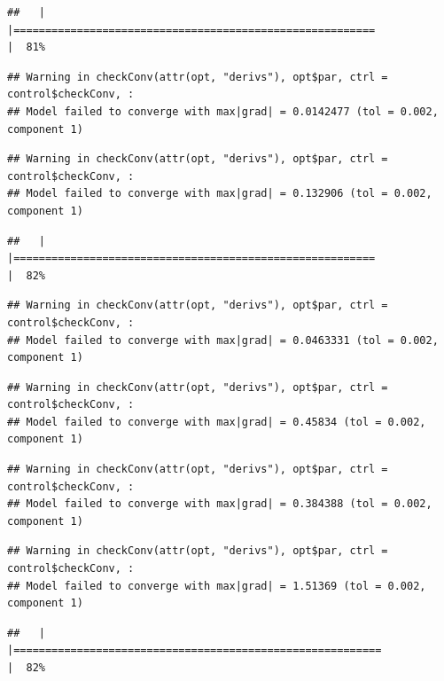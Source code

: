 \documentclass[
  12pt,
]{book}
\begin{document}
\begin{verbatim}
##   |                                                                              |=========================================================             |  81%
\end{verbatim}

\begin{verbatim}
## Warning in checkConv(attr(opt, "derivs"), opt$par, ctrl = control$checkConv, :
## Model failed to converge with max|grad| = 0.0142477 (tol = 0.002, component 1)
\end{verbatim}

\begin{verbatim}
## Warning in checkConv(attr(opt, "derivs"), opt$par, ctrl = control$checkConv, :
## Model failed to converge with max|grad| = 0.132906 (tol = 0.002, component 1)
\end{verbatim}

\begin{verbatim}
##   |                                                                              |=========================================================             |  82%
\end{verbatim}

\begin{verbatim}
## Warning in checkConv(attr(opt, "derivs"), opt$par, ctrl = control$checkConv, :
## Model failed to converge with max|grad| = 0.0463331 (tol = 0.002, component 1)
\end{verbatim}

\begin{verbatim}
## Warning in checkConv(attr(opt, "derivs"), opt$par, ctrl = control$checkConv, :
## Model failed to converge with max|grad| = 0.45834 (tol = 0.002, component 1)
\end{verbatim}

\begin{verbatim}
## Warning in checkConv(attr(opt, "derivs"), opt$par, ctrl = control$checkConv, :
## Model failed to converge with max|grad| = 0.384388 (tol = 0.002, component 1)
\end{verbatim}

\begin{verbatim}
## Warning in checkConv(attr(opt, "derivs"), opt$par, ctrl = control$checkConv, :
## Model failed to converge with max|grad| = 1.51369 (tol = 0.002, component 1)
\end{verbatim}

\begin{verbatim}
##   |                                                                              |==========================================================            |  82%
\end{verbatim}
\end{document}
